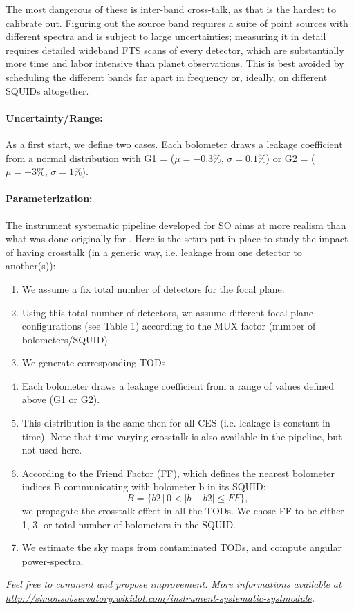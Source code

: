The most dangerous of these is inter-band cross-talk, as that is the hardest to calibrate out.
Figuring out the source band requires a suite of point sources with different spectra and is subject to large uncertainties; measuring it in detail requires detailed wideband FTS scans of every detector, which are substantially more time and labor intensive than planet observations.
This is best avoided by scheduling the different bands far apart in frequency or, ideally, on different SQUIDs altogether.

\paragraph{Uncertainty/Range:}
As a first start, we define two cases.
Each bolometer draws a leakage coefficient from a normal distribution with G1 = ($\mu=-0.3\%,\, \sigma=0.1\%$) or G2 = ($\mu=-3\%,\, \sigma=1\%$).
\paragraph{Parameterization:}
The instrument systematic pipeline developed for SO aims at more realism than what was done originally for \pb. 
Here is the setup put in place to study the impact of having crosstalk (in a generic way, i.e. leakage from one detector to another(s)):
\begin{enumerate}
\item{We assume a fix total number of detectors for the focal plane.}
\item{Using this total number of detectors, we assume different focal plane configurations (see Table 1) according to the MUX factor (number of bolometers/SQUID)}
\item{We generate corresponding TODs.}
\item{Each bolometer draws a leakage coefficient from a range of values defined above (G1 or G2).}
\item{This distribution is the same then for all CES (i.e. leakage is constant in time). Note that time-varying crosstalk is also available in the pipeline, but not used here.}
\item{According to the Friend Factor (FF), which defines the nearest bolometer indices B communicating with bolometer b in its SQUID: 
\begin{equation}
B = \{ b2\, |\, 0 < |b-b2| \leq FF \},
\end{equation} 
we propagate the crosstalk effect in all the TODs. We chose FF to be either 1, 3, or total number of bolometers in the SQUID.}
\item{We estimate the sky maps from contaminated TODs, and compute angular power-spectra.}
\end{enumerate}
\textit{Feel free to comment and propose improvement. More informations available at \url{http://simonsobservatory.wikidot.com/instrument-systematic-systmodule}.}

